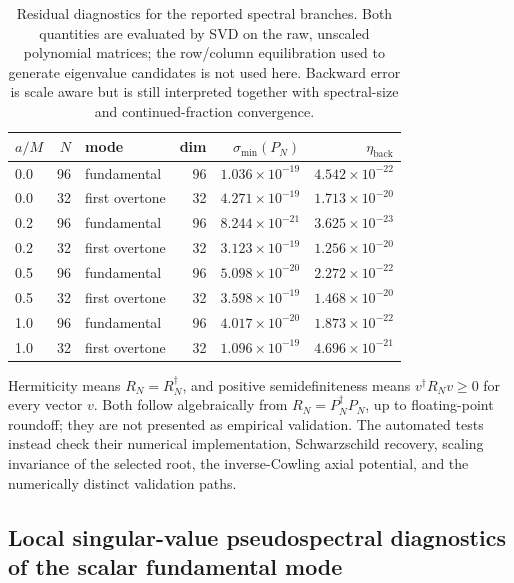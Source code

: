 \documentclass[12pt,a4paper]{article}
\begin{document}
\begin{table}[H]
\centering
\footnotesize
\renewcommand{\arraystretch}{1.14}
\begin{tabular}{lrlrrr}
\toprule
\(a/M\) & \(N\) & mode & dim & \(\sigma_{\min}(P_N)\) & \(\eta_{\mathrm{back}}\)\\
\midrule
0.0 & 96 & fundamental & 96 & \(1.036\times10^{-19}\) & \(4.542\times10^{-22}\)\\
0.0 & 32 & first overtone & 32 & \(4.271\times10^{-19}\) & \(1.713\times10^{-20}\)\\
0.2 & 96 & fundamental & 96 & \(8.244\times10^{-21}\) & \(3.625\times10^{-23}\)\\
0.2 & 32 & first overtone & 32 & \(3.123\times10^{-19}\) & \(1.256\times10^{-20}\)\\
0.5 & 96 & fundamental & 96 & \(5.098\times10^{-20}\) & \(2.272\times10^{-22}\)\\
0.5 & 32 & first overtone & 32 & \(3.598\times10^{-19}\) & \(1.468\times10^{-20}\)\\
1.0 & 96 & fundamental & 96 & \(4.017\times10^{-20}\) & \(1.873\times10^{-22}\)\\
1.0 & 32 & first overtone & 32 & \(1.096\times10^{-19}\) & \(4.696\times10^{-21}\)\\
\bottomrule
\end{tabular}
\caption{Residual diagnostics for the reported spectral branches.  Both
quantities are evaluated by SVD on the raw, unscaled polynomial matrices; the
row/column equilibration used to generate eigenvalue candidates is not used
here.  Backward error is scale aware but is still interpreted together with
spectral-size and continued-fraction convergence.}
\label{tab:residualdiagnostics}
\end{table}

Hermiticity means \(R_N=R_N^\dagger\), and positive semidefiniteness means
\(v^\dagger R_Nv\geq0\) for every vector \(v\).  Both follow algebraically from
\(R_N=P_N^\dagger P_N\), up to floating-point roundoff; they are not presented
as empirical validation.  The automated tests instead check their numerical
implementation, Schwarzschild recovery, scaling invariance of the selected
root, the inverse-Cowling axial potential, and the numerically distinct validation paths.

\subsection{Local singular-value pseudospectral diagnostics of the scalar fundamental mode}
\end{document}
